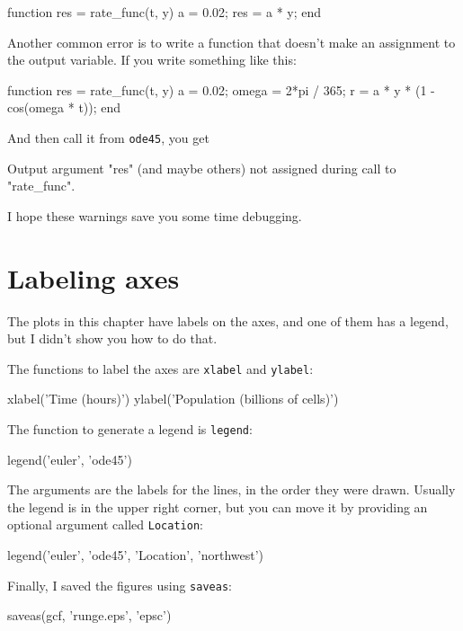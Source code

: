 \documentclass[
]{book}
\numberwithin{Answer}{chapter}
\numberwithin{Exercise}{chapter}
\begin{document}
\begin{code}
function res = rate_func(t, y)     %
    a = 0.02;
    res = a * y;
end
\end{code}

Another common error is to write a function that doesn't make
an assignment to the output variable.  If you write something
like this:

\begin{code}
function res = rate_func(t, y)
    a = 0.02;
    omega = 2*pi / 365;
    r = a * y * (1 - cos(omega * t));    %
end
\end{code}

And then call it from {\tt ode45}, you get

\begin{code}
Output argument "res" (and maybe others) not assigned during call
to "rate_func".
\end{code}

I hope these warnings save you some time debugging.


\section{Labeling axes}

The plots in this chapter have labels on the axes, and one of them has a legend, but I didn't show you how to do that.

The functions to label the axes are {\tt xlabel} and {\tt ylabel}:

\begin{code}
xlabel('Time (hours)')
ylabel('Population (billions of cells)')
\end{code}

The function to generate a legend is {\tt legend}:

\begin{code}
legend('euler', 'ode45')
\end{code}

The arguments are the labels for the lines, in the order they were drawn.  Usually the legend is in the upper right corner, but you can move it by providing an optional argument called {\tt Location}:

\begin{code}
legend('euler', 'ode45', 'Location', 'northwest')
\end{code}

Finally, I saved the figures using {\tt saveas}:

\begin{code}
saveas(gcf, 'runge.eps', 'epsc')
\end{code}
\end{document}
